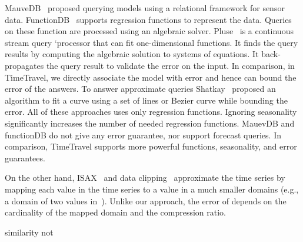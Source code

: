\documentclass{sigmod}
\newcommand{\LNs}{hierarchical model index }
\begin{document}
MauveDB~\cite{MauveDB} proposed  querying models using a relational framework for sensor data.  FunctionDB~\cite{functionDB} supports regression functions to represent the data. Queries on these function are processed using an algebraic solver.
Pluse~\cite{pluse} is a continuous stream query `processor that can fit one-dimensional functions. It finds the query results by computing the algebraic solution to systems of equations. It back-propagates the query result to validate the error on the input. In comparison, in TimeTravel, we directly associate the model with error and hence can bound the error of the answers. 
 To answer approximate queries Shatkay~\cite{Shatkay} proposed  an algorithm to fit a curve using a set of lines or Bezier curve while bounding the error.
All of these approaches uses only regression functions. Ignoring  seasonality significantly increases the number of needed regression functions. MauevDB and functionDB do not give any error guarantee, nor support forecast queries. In comparison, TimeTravel supports more powerful functions, seasonality, and error guarantees. 

On the other hand,  ISAX~\cite{isax,isax2} and data clipping~\cite{clipping} approximate the time series by mapping each value in the time series to a value in a much smaller domains (e.g., a domain of two values in~\cite{clipping}). 
Unlike our approach, the error of   depends on the cardinality of the mapped domain and the compression ratio.

similarity not 


\end{document}
